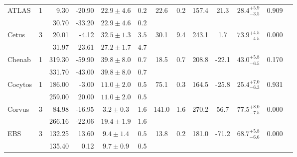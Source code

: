 \begin{tabular}{lcrrccccccccr}
	\multirow{2}{*}{ATLAS} & \multirow{2}{*}{1} & 9.30 & -20.90 & $22.9 \pm 4.6$ & $0.2$ & \multirow{2}{*}{22.6} & \multirow{2}{*}{0.2} & \multirow{2}{*}{157.4} & \multirow{2}{*}{21.3} & \multirow{2}{*}{$28.4^{+5.9}_{-3.5}$} & \multirow{2}{*}{0.909} & \multirow{2}{*}{\citet{Shipp:2018}} \\
	 &  & 30.70 & -33.20 & $22.9 \pm 4.6$ & $0.2$ &  &  &  &  &  &  &  \\
	\multirow{2}{*}{Cetus} & \multirow{2}{*}{3} & 20.01 & -4.12 & $32.5 \pm 1.3$ & $3.5$ & \multirow{2}{*}{30.1} & \multirow{2}{*}{9.4} & \multirow{2}{*}{243.1} & \multirow{2}{*}{1.7} & \multirow{2}{*}{$73.9^{+4.5}_{-4.5}$} & \multirow{2}{*}{0.000} & \multirow{2}{*}{\citet{Yam:2013}} \\
	 &  & 31.97 & 23.61 & $27.2 \pm 1.7$ & $4.7$ &  &  &  &  &  &  &  \\
	\multirow{2}{*}{Chenab} & \multirow{2}{*}{1} & 319.30 & -59.90 & $39.8 \pm 8.0$ & $0.7$ & \multirow{2}{*}{18.5} & \multirow{2}{*}{0.7} & \multirow{2}{*}{208.8} & \multirow{2}{*}{-22.1} & \multirow{2}{*}{$43.0^{+5.8}_{-6.5}$} & \multirow{2}{*}{0.170} & \multirow{2}{*}{\citet{Shipp:2018}} \\
	 &  & 331.70 & -43.00 & $39.8 \pm 8.0$ & $0.7$ &  &  &  &  &  &  &  \\
	\multirow{2}{*}{Cocytos} & \multirow{2}{*}{1} & 186.00 & -3.00 & $11.0 \pm 2.0$ & $0.5$ & \multirow{2}{*}{75.1} & \multirow{2}{*}{0.3} & \multirow{2}{*}{164.5} & \multirow{2}{*}{-25.8} & \multirow{2}{*}{$25.4^{+7.0}_{-6.3}$} & \multirow{2}{*}{0.931} & \multirow{2}{*}{\citet{Grillmair:2009}} \\
	 &  & 259.00 & 20.00 & $11.0 \pm 2.0$ & $0.5$ &  &  &  &  &  &  &  \\
	\multirow{2}{*}{Corvus} & \multirow{2}{*}{3} & 84.98 & -16.95 & $3.2 \pm 0.3$ & $1.6$ & \multirow{2}{*}{141.0} & \multirow{2}{*}{1.6} & \multirow{2}{*}{270.2} & \multirow{2}{*}{56.7} & \multirow{2}{*}{$77.5^{+8.0}_{-7.5}$} & \multirow{2}{*}{0.000} & \multirow{2}{*}{\citet{Mateu:2018}} \\
	 &  & 266.16 & -22.06 & $19.4 \pm 1.9$ & $1.6$ &  &  &  &  &  &  &  \\
	\multirow{2}{*}{EBS} & \multirow{2}{*}{3} & 132.25 & 13.60 & $9.4 \pm 1.4$ & $0.5$ & \multirow{2}{*}{13.8} & \multirow{2}{*}{0.2} & \multirow{2}{*}{181.0} & \multirow{2}{*}{-71.2} & \multirow{2}{*}{$68.7^{+5.8}_{-6.6}$} & \multirow{2}{*}{0.000} & \multirow{2}{*}{\citet{Grillmair:2011}} \\
	 &  & 135.40 & 0.12 & $9.7 \pm 0.9$ & $0.5$ &  &  &  &  &  &  &  \\

\end{tabular}
